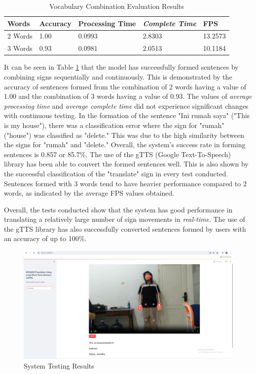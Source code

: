 \begin{table}[H]
  \caption{Vocabulary Combination Evaluation Results}
  \label{tb:combinationevaluation}
  \centering
  \begin{tabular}{lllll}
    \hline
    \textbf{Words} & \textbf{Accuracy} & \textbf{Processing Time} & \emph{\textbf{Complete Time}} & \textbf{FPS}\\
    \hline
    2  Words  & 1.00 & 0.0993 & 2.8303 & 13.2573\\
    3  Words  & 0.93 & 0.0981 & 2.0513 & 10.1184\\
    \hline
  \end{tabular}
\end{table}

It can be seen in Table \ref{tb:combinationevaluation} that the model has successfully formed sentences by combining signs sequentially and continuously. This is demonstrated by the accuracy of sentences formed from the combination of 2 words having a value of 1.00 and the combination of 3 words having a value of 0.93. The values of \emph{average processing time} and \emph{average complete time} did not experience significant changes with continuous testing. In the formation of the sentence "Ini rumah saya" ("This is my house"), there was a classification error where the sign for "rumah" ("house") was classified as "delete." This was due to the high similarity between the signs for "rumah" and "delete." Overall, the system's success rate in forming sentences is 0.857 or 85.7\%. The use of the gTTS (Google Text-To-Speech) library has been able to convert the formed sentences well. This is also shown by the successful classification of the "translate" sign in every test conducted. Sentences formed with 3 words tend to have heavier performance compared to 2 words, as indicated by the average FPS values obtained.

Overall, the tests conducted show that the system has good performance in translating a relatively large number of sign movements in \emph{real-time}. The use of the gTTS library has also successfully converted sentences formed by users with an accuracy of up to 100\%.

\begin{figure}[ht]
    \centering
    \includegraphics[scale=0.12]{gambar/bab3-layoutweb.png}
    \caption{System Testing Results}
    \label{fig:layoutweb}
\end{figure}
